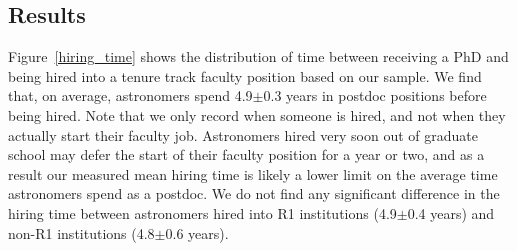 \documentclass[modern]{aastex62}
\begin{document}
\subsection{Results}
Figure~\ref{hiring_time} shows the distribution of time between receiving a PhD and being hired into a tenure track faculty position based on our sample. We find that, on average, astronomers spend 4.9$\pm$0.3 years in postdoc positions before being hired. Note that we only record when someone is hired, and not when they actually start their faculty job. Astronomers hired very soon out of graduate school may defer the start of their faculty position for a year or two, and as a result our measured mean hiring time is likely a lower limit on the average time astronomers spend as a postdoc. We do not find any significant difference in the hiring time between astronomers hired into R1 institutions (4.9$\pm$0.4 years) and non-R1 institutions (4.8$\pm$0.6 years). 
\end{document}
